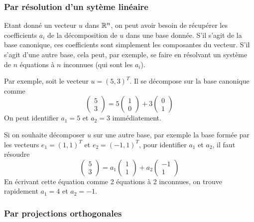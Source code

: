 \subsubsection{Par résolution d'un sytème linéaire}

Etant donné un vecteur $u$ dans $\mathbb{R}^n$, on peut avoir besoin de récupérer les coefficients $a_i$ de la décomposition de $u$ dans une base donnée.
 S'il s'agit de la base canonique, ces coefficients sont simplement les composantes du vecteur. S'il s'agit d'une autre base, cela peut, par exemple, se faire en résolvant un système de $n$ équations à $n$ inconnues (qui sont les $a_i$).

Par exemple, soit le vecteur $u=(5,3)^T$. Il se décompose sur la base canonique comme  
\begin{equation}
\begin{pmatrix} 5 \\ 3 \end{pmatrix} = 5  \begin{pmatrix} 1 \\ 0 \end{pmatrix} + 3  \begin{pmatrix} 0 \\ 1 \end{pmatrix}
\end{equation}
On peut identifier $a_1=5$ et $a_2=3$ immédiatement.

Si on souhaite décomposer $u$ sur une autre base, par exemple la base formée par les vecteurs $e_1=(1,1)^T$ et $e_2=(-1,1)^T$, pour identifier $a_1$ et $a_2$, il faut résoudre
\begin{equation}
\begin{pmatrix} 5 \\ 3 \end{pmatrix}  = a_1  \begin{pmatrix} 1 \\ 1 \end{pmatrix} + a_2  \begin{pmatrix} -1 \\ 1 \end{pmatrix}
\end{equation}
En écrivant cette équation comme 2 équations à 2 inconnues, on trouve rapidement $a_1=4$ et $a_2=-1$.

\subsubsection{Par projections orthogonales}

